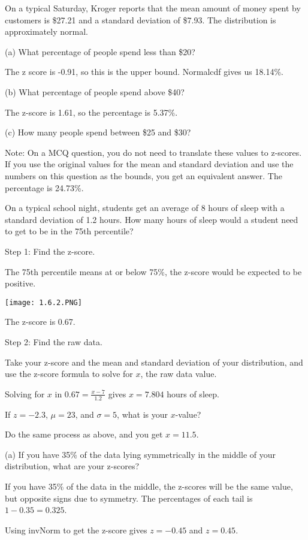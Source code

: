 \documentclass[../stats.tex]{subfiles}
\begin{document}
\begin{example}
    On a typical Saturday, Kroger reports that the mean amount of money spent by customers is \$27.21 and a standard deviation of \$7.93. The distribution is approximately normal.

    (a) What percentage of people spend less than \$20?

    The z score is -0.91, so this is the upper bound. Normalcdf gives us 18.14\%.

    (b) What percentage of people spend above \$40?

    The z-score is 1.61, so the percentage is 5.37\%.

    (c) How many people spend between \$25 and \$30?

    Note: On a MCQ question, you do not need to translate these values to z-scores. If you use the original values for the mean and standard deviation and use the numbers on this question as the bounds, you get an equivalent answer. The percentage is 24.73\%.
\end{example}

\pagebreak
\begin{example}
    On a typical school night, students get an average of 8 hours of sleep with a standard deviation of 1.2 hours. How many hours of sleep would a student need to get to be in the 75th percentile?

    Step 1: Find the z-score.

    The 75th percentile means at or below 75\%, the z-score would be expected to be positive.
    \begin{center}
        \texttt{[image: 1.6.2.PNG]}
    \end{center}
    The z-score is 0.67.

    Step 2: Find the raw data.

    Take your z-score and the mean and standard deviation of your distribution, and use the z-score formula to solve for $x$, the raw data value.

    Solving for $x$ in $0.67=\frac{x-7}{1.2}$ gives $x=7.804$ hours of sleep.
\end{example}

\begin{example}
    If $z=-2.3$, $\mu=23$, and $\sigma = 5$, what is your $x$-value?

    Do the same process as above, and you get $x=11.5$.
\end{example}

\begin{example}
    (a) If you have 35\% of the data lying symmetrically in the middle of your distribution, what are your z-scores?

    If you have 35\% of the data in the middle, the z-scores will be the same value, but opposite signs due to symmetry. The percentages of each tail is $1-0.35=0.325$.

    Using invNorm to get the z-score gives $z=-0.45$ and $z=0.45$.
\end{example}
\end{document}
